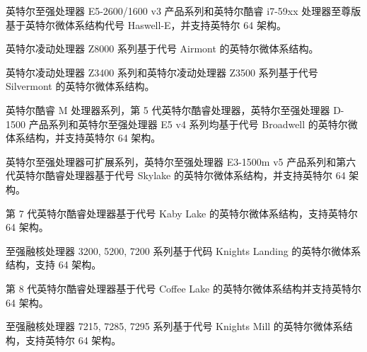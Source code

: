 英特尔至强处理器 E5-2600/1600 v3 产品系列和英特尔酷睿 i7-59xx 处理器至尊版基于英特尔微体系结构代号 Haswell-E，并支持英特尔 64 架构。

英特尔凌动处理器 Z8000 系列基于代号 Airmont 的英特尔微体系结构。

英特尔凌动处理器 Z3400 系列和英特尔凌动处理器 Z3500 系列基于代号 Silvermont 的英特尔微体系结构。

英特尔酷睿 M 处理器系列，第 5 代英特尔酷睿处理器，英特尔至强处理器 D-1500 产品系列和英特尔至强处理器 E5 v4 系列均基于代号 Broadwell 的英特尔微体系结构，并支持英特尔 64 架构。

英特尔至强处理器可扩展系列，英特尔至强处理器 E3-1500m v5 产品系列和第六代英特尔酷睿处理器基于代号 Skylake 的英特尔微体系结构，并支持英特尔 64 架构。

第 7 代英特尔酷睿处理器基于代号 Kaby Lake 的英特尔微体系结构，支持英特尔 64 架构。

至强融核处理器 3200, 5200, 7200 系列基于代码 Knights Landing 的英特尔微体系结构，支持 64 架构。

第 8 代英特尔酷睿处理器基于代号 Coffee Lake 的英特尔微体系结构并支持英特尔 64 架构。

至强融核处理器 7215, 7285, 7295 系列基于代号 Knights Mill 的英特尔微体系结构，支持英特尔 64 架构。

